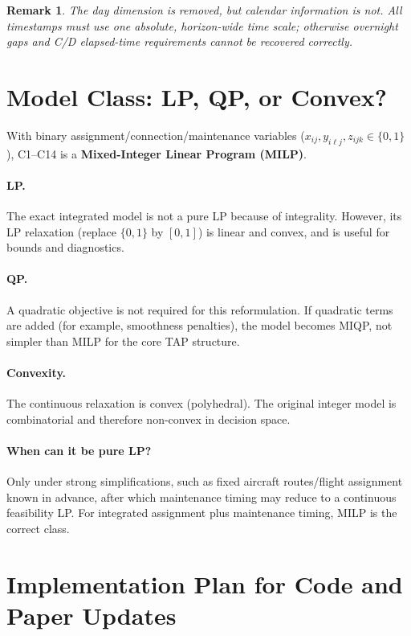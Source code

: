 \documentclass[11pt,a4paper]{article}
\newtheorem{remark}{Remark}
\begin{document}
\begin{remark}
The day dimension is removed, but calendar information is not. All timestamps
must use one absolute, horizon-wide time scale; otherwise overnight gaps and
C/D elapsed-time requirements cannot be recovered correctly.
\end{remark}

\section{Model Class: LP, QP, or Convex?}

With binary assignment/connection/maintenance variables
($x_{ij},y_{i\ell j},z_{ijk}\in\{0,1\}$), C1--C14 is a
\textbf{Mixed-Integer Linear Program (MILP)}.

\paragraph{LP.}
The exact integrated model is not a pure LP because of integrality. However,
its LP relaxation (replace $\{0,1\}$ by $[0,1]$) is linear and convex, and is
useful for bounds and diagnostics.

\paragraph{QP.}
A quadratic objective is not required for this reformulation. If quadratic
terms are added (for example, smoothness penalties), the model becomes MIQP,
not simpler than MILP for the core TAP structure.

\paragraph{Convexity.}
The continuous relaxation is convex (polyhedral). The original integer model is
combinatorial and therefore non-convex in decision space.

\paragraph{When can it be pure LP?}
Only under strong simplifications, such as fixed aircraft routes/flight
assignment known in advance, after which maintenance timing may reduce to a
continuous feasibility LP. For integrated assignment plus maintenance timing,
MILP is the correct class.

\section{Implementation Plan for Code and Paper Updates}
\end{document}
